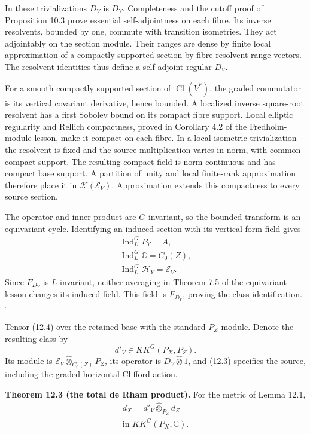 \documentclass[
  11pt,
]{article}
\begin{document}
In these trivializations \(D_V\) is \(D_Y\). Completeness and the cutoff
proof of Proposition 10.3 prove essential self-adjointness on each
fibre. Its inverse resolvents, bounded by one, commute with transition
isometries. They act adjointably on the section module. Their ranges are
dense by finite local approximation of a compactly supported section by
fibre resolvent-range vectors. The resolvent identities thus define a
self-adjoint regular \(D_V\).

For a smooth compactly supported section of \(\operatorname{Cl}(V^*)\),
the graded commutator is its vertical covariant derivative, hence
bounded. A localized inverse square-root resolvent has a first Sobolev
bound on its compact fibre support. Local elliptic regularity and
Rellich compactness, proved in Corollary 4.2 of the Fredholm-module
lesson, make it compact on each fibre. In a local isometric
trivialization the resolvent is fixed and the source multiplication
varies in norm, with common compact support. The resulting compact field
is norm continuous and has compact base support. A partition of unity
and local finite-rank approximation therefore place it in
\(\mathcal K(\mathcal E_V)\). Approximation extends this compactness to
every source section.

The operator and inner product are \(G\)-invariant, so the bounded
transform is an equivariant cycle. Identifying an induced section with
its vertical form field gives \[
\begin{gathered}
\operatorname{Ind}_L^G P_Y=A,\\
\operatorname{Ind}_L^G\mathbb C=C_0(Z),\\
\operatorname{Ind}_L^G\mathcal H_Y=\mathcal E_V.
\end{gathered}
\tag{12.6}
\] Since \(F_{D_Y}\) is \(L\)-invariant, neither averaging in Theorem
7.5 of the equivariant lesson changes its induced field. This field is
\(F_{D_V}\), proving the class identification. \(\square\)

Tensor (12.4) over the retained base with the standard \(P_Z\)-module.
Denote the resulting class by \[
d'_V\in KK^G(P_X,P_Z).
\tag{12.7}
\] Its module is \(\mathcal E_V\widehat\otimes_{C_0(Z)}P_Z\), its
operator is \(D_V\widehat\otimes1\), and (12.3) specifies the source,
including the graded horizontal Clifford action.

\textbf{Theorem 12.3 (the total de Rham product).} For the metric of
Lemma 12.1, \[
\begin{gathered}
d_X=d'_V\widehat\otimes_{P_Z}d_Z\\
\text{in }KK^G(P_X,\mathbb C).
\end{gathered}
\tag{12.8}
\]
\end{document}
